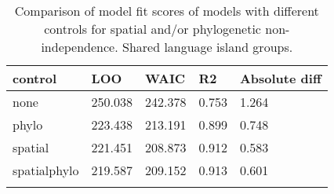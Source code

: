 \begin{longtable}{p{2cm}p{2cm}p{2cm}p{2cm}p{2cm}}
  \toprule
control & LOO & WAIC & R2 & Absolute diff \\ 
  \midrule
none & 250.038 & 242.378 & 0.753 & 1.264 \\ 
  phylo & 223.438 & 213.191 & 0.899 & 0.748 \\ 
  spatial & 221.451 & 208.873 & 0.912 & 0.583 \\ 
  spatialphylo & 219.587 & 209.152 & 0.913 & 0.601 \\ 
   \bottomrule
\caption{Comparison of model fit scores of models with different controls for spatial and/or phylogenetic non-independence. Shared language island groups.} 
\label{model_fit_score_table_SBZR}
\end{longtable}
